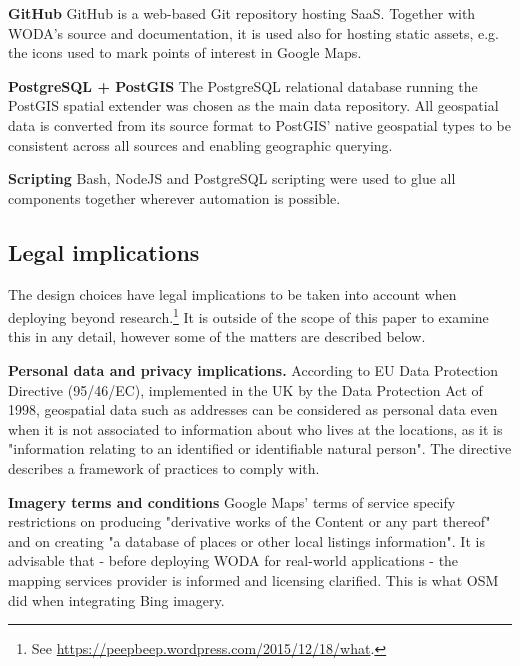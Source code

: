 \textbf{GitHub} GitHub is a web-based Git repository hosting SaaS. Together with WODA's source and documentation, it is used also for hosting static assets, e.g. the icons used to mark points of interest in Google Maps. 

\textbf{PostgreSQL + PostGIS} The PostgreSQL relational database running the PostGIS spatial extender was chosen as the main data repository. All geospatial data is converted from its source format to PostGIS' native geospatial types to be consistent across all sources and enabling geographic querying. 

\textbf{Scripting} Bash, NodeJS and PostgreSQL scripting were used to glue all components together wherever automation is possible.  

\subsection{Legal implications}

The design choices have legal implications to be taken into account when deploying beyond research.\footnote{See \url{https://peepbeep.wordpress.com/2015/12/18/what}.} It is outside of the scope of this paper to examine this in any detail, however some of the matters are described below.

\textbf{Personal data and privacy implications.} According to EU Data Protection Directive (95/46/EC), implemented in the UK by the Data Protection Act of 1998, geospatial data such as addresses can be considered as personal data even when it is not associated to information about who lives at the locations, as it is "information relating to an identified or identifiable natural person". The directive describes a framework of practices to comply with.
	
\textbf{Imagery terms and conditions} Google Maps' terms of service specify restrictions on producing "derivative works of the Content or any part thereof" and on creating "a database of places or other local listings information". It is advisable that - before deploying WODA for real-world applications - the mapping services provider is informed and licensing clarified. This is what OSM did when integrating Bing imagery.
